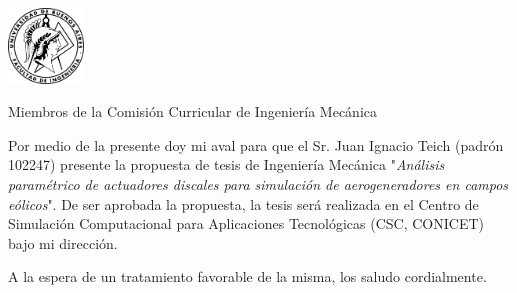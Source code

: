 \documentclass{letter}
\begin{document}
\begin{letter}{\includegraphics[width=0.15\textwidth]{Logo-fiuba.png}\hfill}

\opening{Miembros de la Comisión Curricular de Ingeniería Mecánica}
Por medio de la presente doy mi aval para que el Sr. Juan Ignacio Teich (padrón 102247) presente la propuesta de tesis de Ingeniería Mecánica "\textit{Análisis paramétrico de actuadores discales para simulación de aerogeneradores en campos eólicos}".  De ser aprobada la propuesta, la tesis será realizada en el Centro de Simulación Computacional para Aplicaciones Tecnológicas (CSC, CONICET) bajo mi dirección.
\closing{A la espera de un tratamiento favorable de la misma, los saludo cordialmente.}
\end{letter}
\end{document}
